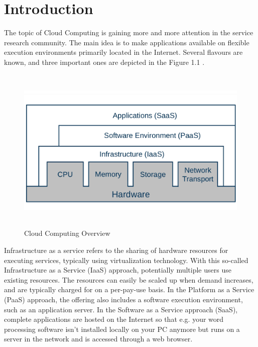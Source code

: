 \chapter{Introduction}
The topic of Cloud Computing is gaining more and more
attention in the service research community. The main idea is
to make applications available on flexible execution
environments primarily located in the Internet. Several
flavours are known, and three important ones are depicted in
the Figure 1.1 .

\begin{figure}[h]
\begin{center}
\includegraphics[height=8cm]{1.jpg}
\caption{Cloud Computing Overview}
\end{center}
\end{figure}

Infrastructure as a service refers to the sharing of
hardware resources for executing services, typically using
virtualization technology. With this so-called Infrastructure
as a Service (IaaS) approach, potentially multiple users use
existing resources. The resources can easily be scaled up
when demand increases, and are typically charged for on a
per-pay-use basis. In the Platform as a Service (PaaS)
approach, the offering also includes a software execution
environment, such as an application server. In the Software
as a Service approach (SaaS), complete applications are
hosted on the Internet so that e.g. your word processing
software isn’t installed locally on your PC anymore but runs
on a server in the network and is accessed through a web
browser.

